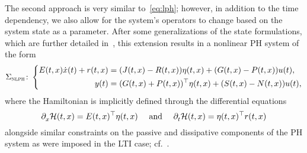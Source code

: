 \begin{remark}
    The second approach is very similar to~\eqref{eq:lph}; however, in addition to the time dependency, we also allow for the system's operators to change based on the system state as a parameter.
    After some generalizations of the state formulations, which are further detailed in~\cite{Mehrmann2023}, this extension results in a nonlinear \ac{PH} system of the form
    \begin{equation}\label{eq:nlph}
        \Sigma_{\msc{nlph}} \colon \left\lbrace
        \begin{aligned}
            E(t, x) \dot{x}(t) + r(t, x) &= (J(t, x) - R(t, x)) \eta(t, x) + (G(t, x) - P(t, x)) u(t), \\
            y(t) &= (G(t, x) + P(t, x))\trans \eta(t, x) + (S(t, x) - N(t, x)) u(t),
        \end{aligned}
        \right.
    \end{equation}
    where the Hamiltonian is implicitly defined through the differential equations
    \begin{equation*}
        \pd{} \mcl{H}(t, x) = E(t, x)\trans \eta(t, x)\quad \text{ and }\quad \pd[t]{} \mcl{H}(t, x) = \eta(t, x)\trans r(t, x)
    \end{equation*}
    alongside similar constraints on the passive and dissipative components of the \ac{PH} system as were imposed in the \ac{LTI} case; cf.~\cite[Definition~4.1]{Mehrmann2023}.
\end{remark}

